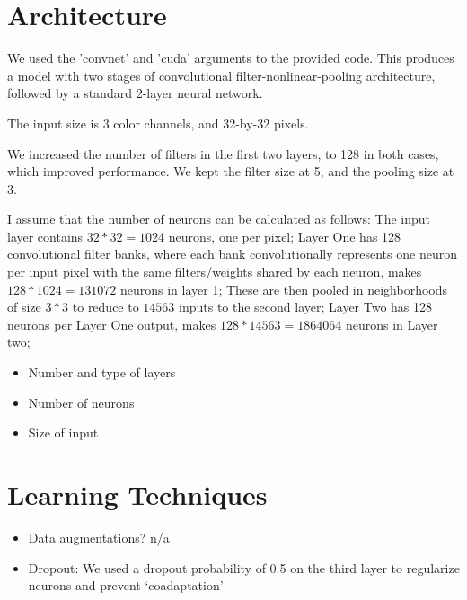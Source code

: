 \documentclass{article}
\begin{document}
\section{Architecture}

We used the 'convnet' and 'cuda' arguments to the provided code. This produces a model with two stages of convolutional filter-nonlinear-pooling architecture, followed by a standard 2-layer neural network.

The input size is 3 color channels, and 32-by-32 pixels.

We increased the number of filters in the first two layers, to 128 in both cases, which improved performance. We kept the filter size at 5, and the pooling size at 3.

I assume that the number of neurons can be calculated as follows: The input layer contains $32*32=1024$ neurons, one per pixel; Layer One has 128 convolutional filter banks, where each bank convolutionally represents one neuron per input pixel with the same filters/weights shared by each neuron, makes $128 * 1024 = 131072$ neurons in layer 1; These are then pooled in neighborhoods of size $3*3$ to reduce to $14563$ inputs to the second layer; Layer Two has 128 neurons per Layer One output, makes $128*14563=1864064$ neurons in Layer two; 

\begin{itemize}
\item Number and type of layers
\item Number of neurons
\item Size of input
\end{itemize}

\section{Learning Techniques}
\begin{itemize}
\item Data augmentations? n/a
\item Dropout: We used a dropout probability of 0.5 on the third layer to
regularize neurons and prevent `coadaptation'
\cite{hinton_improving_2012}
\end{itemize}
\end{document}
